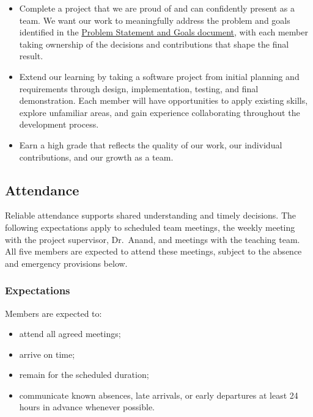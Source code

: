 \documentclass{article}
\begin{document}
\begin{itemize}
    \item Complete a project that we are proud of and can confidently
    present as a team. We want our work to meaningfully address the problem
    and goals identified in the
    \href{https://github.com/AHMEDELZARIA/squigglr/blob/main/pdfs/ProblemStatementAndGoals/ProblemStatement.pdf}
    {Problem Statement and Goals document}, with each member taking
    ownership of the decisions and contributions that shape the final
    result.
    \item Extend our learning by taking a software project from initial
    planning and requirements through design, implementation, testing, and
    final demonstration. Each member will have opportunities to apply
    existing skills, explore unfamiliar areas, and gain experience
    collaborating throughout the development process.
    \item Earn a high grade that reflects the quality of our work, our
    individual contributions, and our growth as a team.
\end{itemize}

\subsection*{Attendance}

Reliable attendance supports shared understanding and timely
decisions. The following expectations apply to scheduled team
meetings, the weekly meeting with the project supervisor,
Dr.~Anand, and meetings with the teaching team. All five members
are expected to attend these meetings, subject to the absence
and emergency provisions below.

\subsubsection*{Expectations}

Members are expected to:

\begin{itemize}
    \item attend all agreed meetings;
    \item arrive on time;
    \item remain for the scheduled duration;
    \item communicate known absences, late arrivals, or early departures
    at least 24 hours in advance whenever possible.
\end{itemize}
\end{document}
